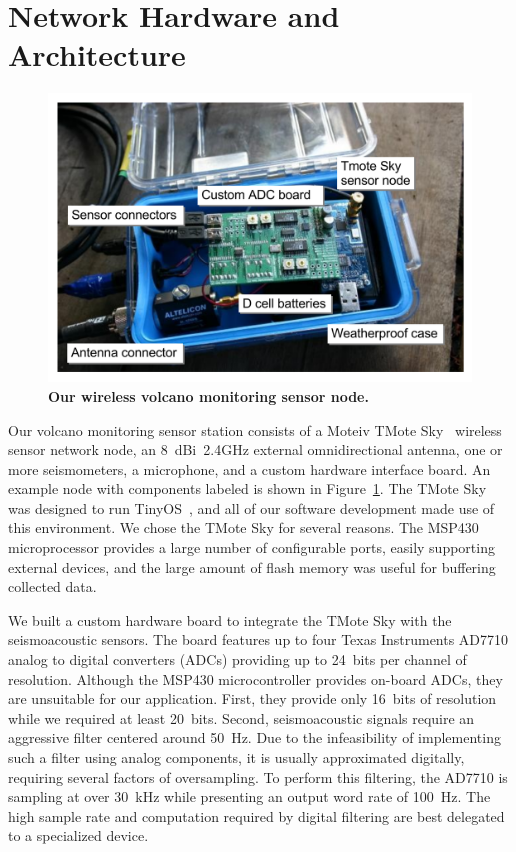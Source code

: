 \section{Network Hardware and Architecture}
\label{evaluation-sec-architecture}

\begin{figure}[t]
\begin{center}
\includegraphics[width=1.0\hsize]{./3-evaluation/figs/node.pdf}
\end{center}
\caption{\textbf{Our wireless volcano monitoring sensor node.}}
\label{evaluation-fig-node}
\end{figure}

Our volcano monitoring sensor station consists of a Moteiv TMote
Sky~\cite{moteiv} wireless sensor network node, an 8~dBi~2.4GHz external
omnidirectional antenna, one or more seismometers, a microphone, and a custom
hardware interface board. An example node with components labeled is shown in
Figure~\ref{evaluation-fig-node}. The TMote Sky was designed to run
TinyOS~\cite{tinyos-asplos00}, and all of our software development made use
of this environment. We chose the TMote Sky for several reasons. The MSP430
microprocessor provides a large number of configurable ports, easily
supporting external devices, and the large amount of flash memory was useful
for buffering collected data.

We built a custom hardware board to integrate the TMote Sky with the
seismoacoustic sensors. The board features up to four Texas Instruments
AD7710 analog to digital converters (ADCs) providing up to 24~bits per
channel of resolution. Although the MSP430 microcontroller provides on-board
ADCs, they are unsuitable for our application. First, they provide only
16~bits of resolution while we required at least 20~bits. Second,
seismoacoustic signals require an aggressive filter centered around 50~Hz.
Due to the infeasibility of implementing such a filter using analog
components, it is usually approximated digitally, requiring several factors
of oversampling. To perform this filtering, the AD7710 is sampling at over
30~kHz while presenting an output word rate of 100~Hz. The high sample rate
and computation required by digital filtering are best delegated to a
specialized device.

